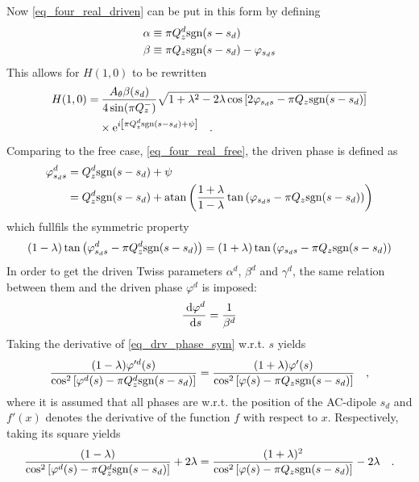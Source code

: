 %
Now \eqref{eq_four_real_driven} can be put in this form by defining
%
\begin{align}
  \alpha &\equiv \pi Q^{d}_{z} \text{sgn}(s-s_d) \notag \\
  \beta &\equiv \pi Q_z\text{sgn}(s-s_d) - \varphi_{s_ds}
\end{align}
%
This allows for $H(1,0)$ to be rewritten
%
\begin{align}
  H(1,0) =&\: \frac{A_\theta\beta(s_d)}{4\sin(\pi Q_z^-)}
      \sqrt{1+\lambda^2-2\lambda\cos\left[2\varphi_{s_ds} - \pi Q_z\text{sgn}(s-s_d)\right]} \notag \\
      &\times\text{e}^{i\left[ \pi Q^{d}_{z}\text{sgn}(s-s_d) + \psi \right]}
  \quad .
  \label{eq_H_drv}
\end{align}
%
Comparing to the free case, \eqref{eq_four_real_free}, the driven phase is defined as 
%
\begin{align}
  \varphi^d_{s_ds} &=  Q^{d}_{z}\text{sgn}(s-s_d) + \psi\notag\\
  &=  Q^{d}_{z}\text{sgn}(s-s_d)
  + \mathrm{atan}\left( \frac{1+\lambda}{1-\lambda}\tan\left( \varphi_{s_ds}-\pi Q_z\text{sgn}(s-s_d)\right) \right)
\end{align}
%
which fullfils the symmetric property
%
\begin{equation}
  (1-\lambda)\tan\left( \varphi^d_{s_ds} -\pi Q^{d}_{z}\text{sgn}(s-s_d) \right)
  =
  (1+\lambda)\tan\left( \varphi_{s_ds} -\pi Q_z\text{sgn}(s-s_d) \right)
  \label{eq_drv_phase_sym}
\end{equation}
%
In order to get the driven Twiss parameters $\alpha^d$, $\beta^d$ and $\gamma^d$, the same relation
between them and the driven phase $\varphi^d$ is imposed:
\begin{equation}
  \frac{\;\text{d} \varphi^d}{\;\text{d} s} = \frac{1}{\beta^d}
\end{equation}
%
Taking the derivative of  \eqref{eq_drv_phase_sym} w.r.t. $s$ yields
%
\begin{equation}
  \frac{(1-\lambda)\varphi'^d(s)}{\cos^2\left[ \varphi^d(s) - \pi Q^{d}_{z}\text{sgn}(s-s_d) \right]}
  =
  \frac{(1+\lambda)\varphi'(s)}{\cos^2\left[ \varphi(s) - \pi Q_z\text{sgn}(s-s_d) \right]}
  \quad ,
\end{equation}
%
where it is assumed that all phases are w.r.t. the position of the AC-dipole $s_d$ and $f'(x)$ denotes
the derivative of the function $f$ with respect to $x$.
Respectively, taking its square yields
\begin{equation}
  \frac{(1-\lambda)}{\cos^2\left[ \varphi^d(s) - \pi Q^{d}_{z}\text{sgn}(s-s_d) \right]} +2\lambda
  =
  \frac{(1+\lambda)^2}{\cos^2\left[ \varphi(s) - \pi Q_z\text{sgn}(s-s_d) \right]} -2\lambda
  \quad .
  \label{<+label+>}
\end{equation}
